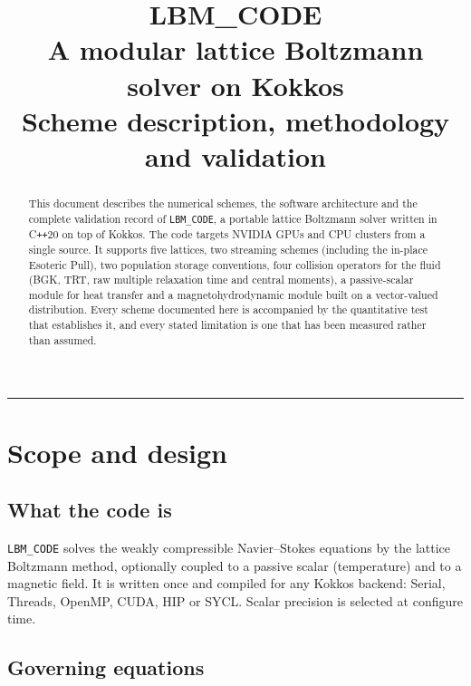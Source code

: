 \documentclass[11pt,a4paper]{article}
\title{\vspace{-1.4cm}\textbf{LBM\_CODE}\\[2mm]
\large A modular lattice Boltzmann solver on Kokkos\\[1mm]
\normalsize Scheme description, methodology and validation}
\author{}
\date{}
\newcommand{\code}[1]{\texttt{\small #1}}
\begin{document}
\maketitle
\vspace{-1.2cm}

\begin{abstract}
\noindent
This document describes the numerical schemes, the software architecture and the
complete validation record of \code{LBM\_CODE}, a portable lattice Boltzmann
solver written in C\texttt{++}20 on top of Kokkos. The code targets NVIDIA GPUs
and CPU clusters from a single source. It supports five lattices, two streaming
schemes (including the in-place Esoteric Pull), two population storage
conventions, four collision operators for the fluid (BGK, TRT, raw multiple
relaxation time and central moments), a passive-scalar module for heat transfer
and a magnetohydrodynamic module built on a vector-valued distribution. Every
scheme documented here is accompanied by the quantitative test that establishes
it, and every stated limitation is one that has been measured rather than
assumed.
\end{abstract}

\tableofcontents
\bigskip
\hrule

\section{Scope and design}

\subsection{What the code is}

\code{LBM\_CODE} solves the weakly compressible Navier--Stokes equations by the
lattice Boltzmann method, optionally coupled to a passive scalar (temperature)
and to a magnetic field. It is written once and compiled for any Kokkos backend:
Serial, Threads, OpenMP, CUDA, HIP or SYCL. Scalar precision is selected at
configure time.

\subsection{Governing equations}
\end{document}
